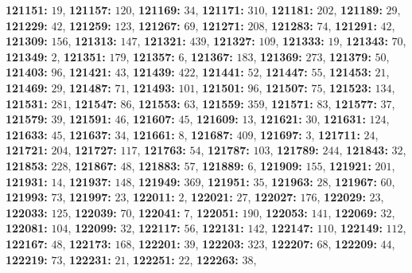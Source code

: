 \textsf{\bfseries 121151:} $19$, \textsf{\bfseries 121157:} $120$, \textsf{\bfseries 121169:} $34$, \textsf{\bfseries 121171:} $310$, \textsf{\bfseries 121181:} $202$, \textsf{\bfseries 121189:} $29$, \textsf{\bfseries 121229:} $42$, \textsf{\bfseries 121259:} $123$, \textsf{\bfseries 121267:} $69$, \textsf{\bfseries 121271:} $208$, \textsf{\bfseries 121283:} $74$, \textsf{\bfseries 121291:} $42$, \textsf{\bfseries 121309:} $156$, \textsf{\bfseries 121313:} $147$, \textsf{\bfseries 121321:} $439$, \textsf{\bfseries 121327:} $109$, \textsf{\bfseries 121333:} $19$, \textsf{\bfseries 121343:} $70$, \textsf{\bfseries 121349:} $2$, \textsf{\bfseries 121351:} $179$, \textsf{\bfseries 121357:} $6$, \textsf{\bfseries 121367:} $183$, \textsf{\bfseries 121369:} $273$, \textsf{\bfseries 121379:} $50$, \textsf{\bfseries 121403:} $96$, \textsf{\bfseries 121421:} $43$, \textsf{\bfseries 121439:} $422$, \textsf{\bfseries 121441:} $52$, \textsf{\bfseries 121447:} $55$, \textsf{\bfseries 121453:} $21$, \textsf{\bfseries 121469:} $29$, \textsf{\bfseries 121487:} $71$, \textsf{\bfseries 121493:} $101$, \textsf{\bfseries 121501:} $96$, \textsf{\bfseries 121507:} $75$, \textsf{\bfseries 121523:} $134$, \textsf{\bfseries 121531:} $281$, \textsf{\bfseries 121547:} $86$, \textsf{\bfseries 121553:} $63$, \textsf{\bfseries 121559:} $359$, \textsf{\bfseries 121571:} $83$, \textsf{\bfseries 121577:} $37$, \textsf{\bfseries 121579:} $39$, \textsf{\bfseries 121591:} $46$, \textsf{\bfseries 121607:} $45$, \textsf{\bfseries 121609:} $13$, \textsf{\bfseries 121621:} $30$, \textsf{\bfseries 121631:} $124$, \textsf{\bfseries 121633:} $45$, \textsf{\bfseries 121637:} $34$, \textsf{\bfseries 121661:} $8$, \textsf{\bfseries 121687:} $409$, \textsf{\bfseries 121697:} $3$, \textsf{\bfseries 121711:} $24$, \textsf{\bfseries 121721:} $204$, \textsf{\bfseries 121727:} $117$, \textsf{\bfseries 121763:} $54$, \textsf{\bfseries 121787:} $103$, \textsf{\bfseries 121789:} $244$, \textsf{\bfseries 121843:} $32$, \textsf{\bfseries 121853:} $228$, \textsf{\bfseries 121867:} $48$, \textsf{\bfseries 121883:} $57$, \textsf{\bfseries 121889:} $6$, \textsf{\bfseries 121909:} $155$, \textsf{\bfseries 121921:} $201$, \textsf{\bfseries 121931:} $14$, \textsf{\bfseries 121937:} $148$, \textsf{\bfseries 121949:} $369$, \textsf{\bfseries 121951:} $35$, \textsf{\bfseries 121963:} $28$, \textsf{\bfseries 121967:} $60$, \textsf{\bfseries 121993:} $73$, \textsf{\bfseries 121997:} $23$, \textsf{\bfseries 122011:} $2$, \textsf{\bfseries 122021:} $27$, \textsf{\bfseries 122027:} $176$, \textsf{\bfseries 122029:} $23$, \textsf{\bfseries 122033:} $125$, \textsf{\bfseries 122039:} $70$, \textsf{\bfseries 122041:} $7$, \textsf{\bfseries 122051:} $190$, \textsf{\bfseries 122053:} $141$, \textsf{\bfseries 122069:} $32$, \textsf{\bfseries 122081:} $104$, \textsf{\bfseries 122099:} $32$, \textsf{\bfseries 122117:} $56$, \textsf{\bfseries 122131:} $142$, \textsf{\bfseries 122147:} $110$, \textsf{\bfseries 122149:} $112$, \textsf{\bfseries 122167:} $48$, \textsf{\bfseries 122173:} $168$, \textsf{\bfseries 122201:} $39$, \textsf{\bfseries 122203:} $323$, \textsf{\bfseries 122207:} $68$, \textsf{\bfseries 122209:} $44$, \textsf{\bfseries 122219:} $73$, \textsf{\bfseries 122231:} $21$, \textsf{\bfseries 122251:} $22$, \textsf{\bfseries 122263:} $38$, 
